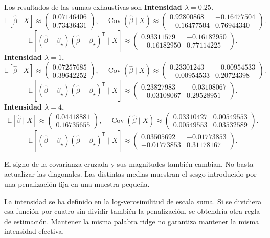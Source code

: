 \documentclass[11pt,a4paper]{article}
\newcommand{\E}{\mathbb E}
\newcommand{\T}{^{\mathsf T}}
\DeclareMathOperator{\Cov}{Cov}
\begin{document}
Los resultados de las sumas exhaustivas son
\textbf{Intensidad \(\lambda=0.25\).}\[
\E[\widehat\beta\mid X]\approx\begin{pmatrix}0.07146406\\0.73436431\end{pmatrix},\quad \Cov(\widehat\beta\mid X)\approx\begin{pmatrix}0.92800868&-0.16477504\\-0.16477504&0.76944340\end{pmatrix}.
\]
\[
\E[(\widehat\beta-\beta_\star)(\widehat\beta-\beta_\star)\T\mid X]\approx\begin{pmatrix}0.93311579&-0.16182950\\-0.16182950&0.77114225\end{pmatrix}.
\]
\textbf{Intensidad \(\lambda=1\).}\[
\E[\widehat\beta\mid X]\approx\begin{pmatrix}0.07257685\\0.39642252\end{pmatrix},\quad \Cov(\widehat\beta\mid X)\approx\begin{pmatrix}0.23301243&-0.00954533\\-0.00954533&0.20724398\end{pmatrix}.
\]
\[
\E[(\widehat\beta-\beta_\star)(\widehat\beta-\beta_\star)\T\mid X]\approx\begin{pmatrix}0.23827983&-0.03108067\\-0.03108067&0.29528951\end{pmatrix}.
\]
\textbf{Intensidad \(\lambda=4\).}\[
\E[\widehat\beta\mid X]\approx\begin{pmatrix}0.04418881\\0.16735655\end{pmatrix},\quad \Cov(\widehat\beta\mid X)\approx\begin{pmatrix}0.03310427&0.00549553\\0.00549553&0.03532589\end{pmatrix}.
\]
\[
\E[(\widehat\beta-\beta_\star)(\widehat\beta-\beta_\star)\T\mid X]\approx\begin{pmatrix}0.03505692&-0.01773853\\-0.01773853&0.31178167\end{pmatrix}.
\]

El signo de la covarianza cruzada y sus magnitudes
también cambian. No basta actualizar las diagonales.
Las distintas medias muestran el sesgo introducido
por una penalización fija en una muestra pequeña.

La intensidad se ha definido en la log-verosimilitud
de escala suma. Si se dividiera esa función por cuatro
sin dividir también la penalización, se obtendría
otra regla de estimación.
Mantener la misma palabra ridge no garantiza
mantener la misma intensidad efectiva.
\end{document}
